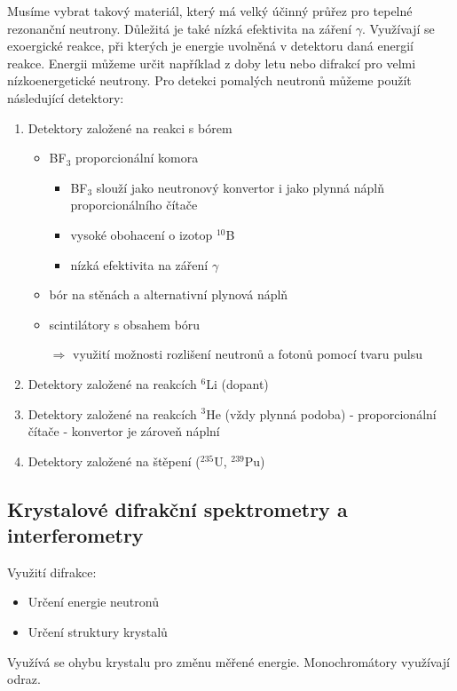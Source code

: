 \documentclass[../../main.tex]{subfiles}
\begin{document}
Musíme vybrat takový materiál, který má velký účinný průřez pro tepelné rezonanční neutrony. Důležitá je také nízká efektivita na záření $\gamma$. Využívají se exoergické reakce,  při kterých je energie uvolněná v detektoru daná energií reakce. Energii můžeme určit například z doby letu nebo difrakcí pro velmi nízkoenergetické neutrony. Pro detekci pomalých neutronů můžeme použít následující detektory:
\begin{enumerate}
	\item Detektory založené na reakci s bórem
	\begin{itemize}
		\item BF$_3$ proporcionální komora
		\begin{itemize}
			\item BF$_3$ slouží jako neutronový konvertor i jako plynná náplň proporcionálního čítače
			\item vysoké obohacení o izotop $^{10}$B
			\item nízká efektivita na záření $\gamma$
		\end{itemize}
	 \item bór na stěnách a alternativní plynová náplň 
	 \item scintilátory s obsahem bóru
	 
	 $\Rightarrow$ využití možnosti rozlišení neutronů a fotonů pomocí tvaru pulsu
	\end{itemize}
    \item Detektory založené na reakcích $^{6}$Li (dopant)
    \item Detektory založené na reakcích $^{3}$He (vždy plynná podoba) - proporcionální čítače - konvertor je zároveň náplní
    \item Detektory založené na štěpení ($^{235}$U, $^{239}$Pu)
\end{enumerate}

\subsection{Krystalové difrakční spektrometry a interferometry}	

Využití difrakce:
\begin{itemize}
	\item Určení energie neutronů
	\item Určení struktury krystalů
\end{itemize}

Využívá se ohybu krystalu pro změnu měřené energie. Monochromátory využívají odraz.
\end{document}
